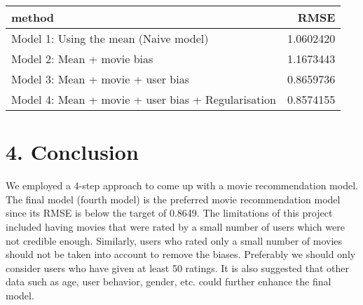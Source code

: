 \documentclass[
]{article}
\begin{document}
\begin{longtable}[]{@{}lr@{}}
\toprule
method & RMSE \\
\midrule
\endhead
Model 1: Using the mean (Naive model) & 1.0602420 \\
Model 2: Mean + movie bias & 1.1673443 \\
Model 3: Mean + movie + user bias & 0.8659736 \\
Model 4: Mean + movie + user bias + Regularisation & 0.8574155 \\
\bottomrule
\end{longtable}

\hypertarget{conclusion}{%
\section{4. Conclusion}\label{conclusion}}

We employed a 4-step approach to come up with a movie recommendation
model. The final model (fourth model) is the preferred movie
recommendation model since its RMSE is below the target of 0.8649. The
limitations of this project included having movies that were rated by a
small number of users which were not credible enough. Similarly, users
who rated only a small number of movies should not be taken into account
to remove the biases. Preferably we should only consider users who have
given at least 50 ratings. It is also suggested that other data such as
age, user behavior, gender, etc. could further enhance the final model.
\end{document}

